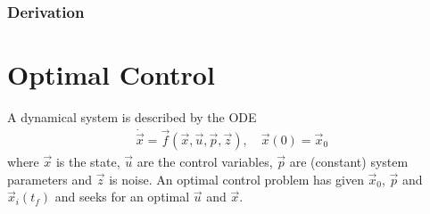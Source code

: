 		\subsection{Derivation} %

\chapter{Optimal Control}
	\label{c:optimalControl}

	A dynamical system is described by the ODE
	\begin{align*}
		\dot{\vec{x}} = \vec{f}(\vec{x}, \vec{u}, \vec{p}, \vec{z}),\quad \vec{x}(0) = \vec{x}_0
	\end{align*}
	where \(\vec{x}\) is the state, \(\vec{u}\) are the control variables, \(\vec{p}\) are (constant) system parameters and \(\vec{z}\) is noise. An optimal control problem has given \(\vec{x}_0\), \(\vec{p}\) and \(\vec{x}_i(t_f)\) and seeks for an optimal \(\vec{u}\) and \(\vec{x}\).

